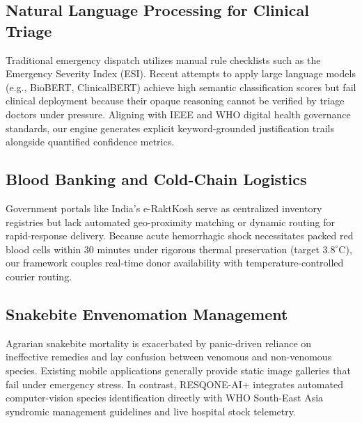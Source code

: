 \documentclass[conference]{IEEEtran}
\begin{document}
\subsection{Natural Language Processing for Clinical Triage}
Traditional emergency dispatch utilizes manual rule checklists such as the Emergency Severity Index (ESI). Recent attempts to apply large language models (e.g., BioBERT, ClinicalBERT) achieve high semantic classification scores but fail clinical deployment because their opaque reasoning cannot be verified by triage doctors under pressure. Aligning with IEEE and WHO digital health governance standards, our engine generates explicit keyword-grounded justification trails alongside quantified confidence metrics.

\subsection{Blood Banking and Cold-Chain Logistics}
Government portals like India's e-RaktKosh serve as centralized inventory registries but lack automated geo-proximity matching or dynamic routing for rapid-response delivery. Because acute hemorrhagic shock necessitates packed red blood cells within 30 minutes under rigorous thermal preservation (target $3.8^\circ\text{C}$), our framework couples real-time donor availability with temperature-controlled courier routing.

\subsection{Snakebite Envenomation Management}
Agrarian snakebite mortality is exacerbated by panic-driven reliance on ineffective remedies and lay confusion between venomous and non-venomous species. Existing mobile applications generally provide static image galleries that fail under emergency stress. In contrast, RESQONE-AI+ integrates automated computer-vision species identification directly with WHO South-East Asia syndromic management guidelines and live hospital stock telemetry.
\end{document}
